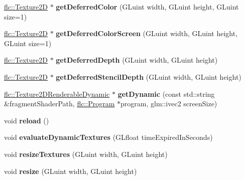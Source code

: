 \begin{DoxyCompactItemize}
\hyperlink{classflw_1_1flc_1_1Texture2D}{flc\+::\+Texture2D} $\ast$ {\bfseries get\+Deferred\+Color} (G\+Luint width, G\+Luint height, G\+Luint size=1)
\item 
\mbox{\label{classflw_1_1flf_1_1TextureSystem_ab9410893146bdceeffa40920854d0a80}} 
\hyperlink{classflw_1_1flc_1_1Texture2D}{flc\+::\+Texture2D} $\ast$ {\bfseries get\+Deferred\+Color\+Screen} (G\+Luint width, G\+Luint height, G\+Luint size=1)
\item 
\mbox{\label{classflw_1_1flf_1_1TextureSystem_a16d7fa82194030e053f4b6e31b16a6ea}} 
\hyperlink{classflw_1_1flc_1_1Texture2D}{flc\+::\+Texture2D} $\ast$ {\bfseries get\+Deferred\+Depth} (G\+Luint width, G\+Luint height)
\item 
\mbox{\label{classflw_1_1flf_1_1TextureSystem_adc4389c36ca208aac2fb7169811dd1d9}} 
\hyperlink{classflw_1_1flc_1_1Texture2D}{flc\+::\+Texture2D} $\ast$ {\bfseries get\+Deferred\+Stencil\+Depth} (G\+Luint width, G\+Luint height)
\item 
\mbox{\label{classflw_1_1flf_1_1TextureSystem_a22fc3ecfeb13b08a3e025463b7158afd}} 
\hyperlink{classflw_1_1flc_1_1Texture2DRenderableDynamic}{flc\+::\+Texture2\+D\+Renderable\+Dynamic} $\ast$ {\bfseries get\+Dynamic} (const std\+::string \&fragment\+Shader\+Path, \hyperlink{classflw_1_1flc_1_1Program}{flc\+::\+Program} $\ast$program, glm\+::ivec2 screen\+Size)
\item 
\mbox{\label{classflw_1_1flf_1_1TextureSystem_a91cc19d1dcd33ef3ad9bb9f7f6594d38}} 
void {\bfseries reload} ()
\item 
\mbox{\label{classflw_1_1flf_1_1TextureSystem_a40a4c044212ad771e4e832970d1e50b7}} 
void {\bfseries evaluate\+Dynamic\+Textures} (G\+Lfloat time\+Expired\+In\+Seconds)
\item 
\mbox{\label{classflw_1_1flf_1_1TextureSystem_a2a238d17b12e782d64f177a8bfde7cd5}} 
void {\bfseries resize\+Textures} (G\+Luint width, G\+Luint height)
\item 
\mbox{\label{classflw_1_1flf_1_1TextureSystem_a7c134d68d2bfc21f16b3ad1316404713}} 
void {\bfseries resize} (G\+Luint width, G\+Luint height)
\end{DoxyCompactItemize}


